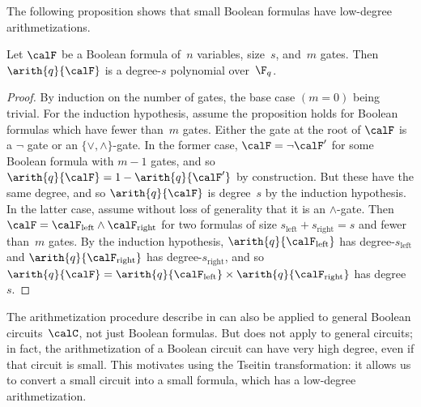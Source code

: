 The following proposition shows that small Boolean formulas have low-degree arithmetizations.

\begin{proposition}\label{prop:low-degree-arithmetization}
Let $\calF$ be a Boolean formula of~$n$ variables, size~$s$, and~$m$ gates.
Then $\arith{q}{\calF}$ is a degree-$s$ polynomial over~$\F_q$.
\end{proposition}
\begin{proof}
By induction on the number of gates, the base case $(m = 0)$ being trivial.
For the induction hypothesis, assume the proposition holds for Boolean formulas which have fewer than~$m$ gates.
Either the gate at the root of $\calF$ is a $\neg$ gate or an $\{\lor, \land\}$-gate.
In the former case, $\calF = \neg \calF'$ for some Boolean formula with $m-1$ gates,
and so $\arith{q}{\calF} = 1 - \arith{q}{\calF'}$ by construction.
But these have the same degree, and so $\arith{q}{\calF}$ is degree~$s$ by the induction hypothesis.
In the latter case, assume without loss of generality that it is an $\land$-gate. 
Then $\calF= \calF_{\mathrm{left}} \land \calF_{\mathrm{right}}$ for two formulas
of size $s_{\mathrm{left}} + s_{\mathrm{right}} = s$ and fewer than~$m$ gates.
By the induction hypothesis, $\arith{q}{\calF_{\mathrm{left}}}$ has degree-$s_{\mathrm{left}}$ and
$\arith{q}{\calF_{\mathrm{right}}}$ has degree-$s_{\mathrm{right}}$,
and so $\arith{q}{\calF} = \arith{q}{\calF_{\mathrm{left}}} \times \arith{q}{\calF_{\mathrm{right}}}$ has degree~$s$.
\end{proof}

The arithmetization procedure describe in  can also be applied to general Boolean circuits~$\calC$, not just Boolean formulas.
But  does not apply to general circuits;
in fact, the arithmetization of a Boolean circuit can have very high degree, even if that circuit is small.
This motivates using the Tseitin transformation: it allows us to convert a small circuit into a small formula, which has a low-degree arithmetization.




